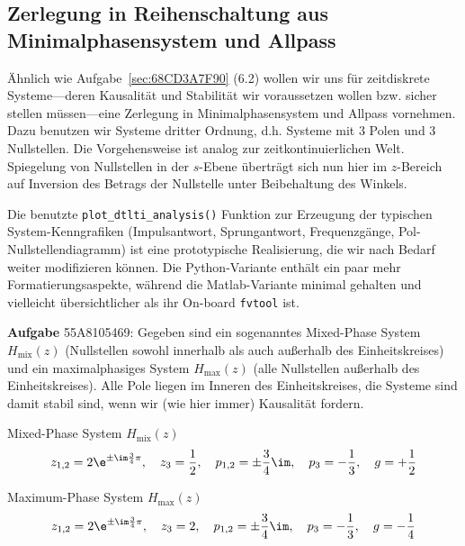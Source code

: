 \subsection{Zerlegung in Reihenschaltung aus Minimalphasensystem und Allpass}
\label{sec:55A8105469}
\begin{Ziel}
Ähnlich wie Aufgabe~\ref{sec:68CD3A7F90} (6.2) wollen wir uns für zeitdiskrete Systeme---deren
Kausalität und Stabilität wir voraussetzen wollen bzw. sicher stellen müssen---eine
Zerlegung in Minimalphasensystem und Allpass vornehmen. Dazu benutzen
wir Systeme dritter Ordnung, d.h. Systeme
mit 3 Polen und 3 Nullstellen. Die Vorgehensweise
ist analog zur zeitkontinuierlichen Welt. Spiegelung von Nullstellen in
der $s$-Ebene überträgt sich nun hier im $z$-Bereich auf
Inversion des Betrags der Nullstelle unter Beibehaltung des
Winkels.
%

Die benutzte \texttt{plot\_dtlti\_analysis()} Funktion zur Erzeugung der
typischen System-Kenngrafiken (Impulsantwort, Sprungantwort, Frequenzgänge,
Pol-Nullstellendiagramm) ist eine prototypische
Realisierung, die wir nach Bedarf weiter modifizieren können. Die Python-Variante
enthält ein paar mehr Formatierungsaspekte, während die Matlab-Variante
minimal gehalten und vielleicht übersichtlicher als ihr On-board
\texttt{fvtool} ist.
%
\end{Ziel}
\textbf{Aufgabe} {\tiny 55A8105469}:
Gegeben sind ein sogenanntes Mixed-Phase System $H_\mathrm{mix}(z)$
(Nullstellen sowohl innerhalb als auch außerhalb des
Einheitskreises) und ein maximalphasiges System $H_\mathrm{max}(z)$
(alle Nullstellen außerhalb des Einheitskreises). Alle Pole liegen im Inneren
des Einheitskreises, die Systeme sind damit stabil sind, wenn wir (wie hier immer)
Kausalität fordern.

Mixed-Phase System $H_\mathrm{mix}(z)$
\begin{align}
z_{1,2} = 2 \e^{\pm\im\frac{3}{4}\pi},\quad z_3 = \frac{1}{2},\quad
p_{1,2} = \pm\frac{3}{4}\im,\quad p_3 = -\frac{1}{3},\quad
g = + \frac{1}{2}
\end{align}

Maximum-Phase System $H_\mathrm{max}(z)$
\begin{align}
z_{1,2} = 2 \e^{\pm\im\frac{3}{4}\pi},\quad z_3 = 2,\quad
p_{1,2} = \pm\frac{3}{4}\im,\quad p_3 = -\frac{1}{3},\quad
g = - \frac{1}{4}
\end{align}

